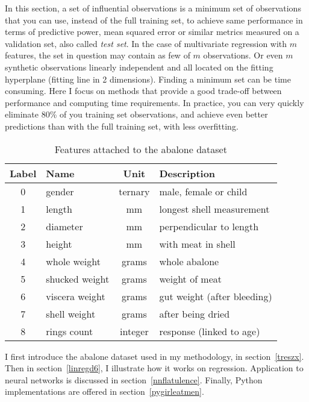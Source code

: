 \documentclass[oneside,10pt]{book}
\begin{document}
In this section, a set of influential observations is a minimum set of observations that you can use, instead of the full training set, to
 achieve same performance in terms of predictive power, mean squared error or similar metrics measured on a
\textcolor{index}{validation set}, also called {\em test set}. In the case of multivariate regression with $m$ features,
 the set in question may contain as few of $m$ observations. Or even $m$ synthetic observations linearly independent and all located on the fitting hyperplane
 (fitting line in 2 dimensions). Finding a minimum set can be time consuming. Here I focus on methods that provide a good trade-off
 between performance and computing time requirements. In practice, you can very quickly eliminate  80\% of you training set observations, and achieve even better predictions than with the full training set, with less overfitting.




\begin{table}[H]
\begin{center}
\begin{tabular}{|c|l|c|l|}
\hline
 Label &  Name & Unit	& Description\\
\hline
\hline
0 & gender & ternary & male, female or child \\
1 &  length & mm & longest shell measurement \\
2 &  diameter & mm & perpendicular to length \\
3 &  height & mm & with meat in shell \\
4 &  whole weight & grams & whole abalone \\
5 &  shucked weight & grams &  weight of meat \\
6 & viscera weight &  grams & gut weight (after bleeding) \\
7 & shell weight &  grams &  after being dried \\
8 & rings count & integer & response (linked to age) \\
\hline
\end{tabular}
\caption{\label{choctres} Features attached to the abalone dataset}
\end{center}
\end{table}

I first introduce the abalone dataset used in my methodology, in section~\ref{treszx}. Then in section~\ref{linregd6},
 I illustrate how it works on regression.  Application to neural networks is discussed in section~\ref{nnflatulence}. Finally, Python
 implementations are offered in section~\ref{pygirleatmen}.
\end{document}
